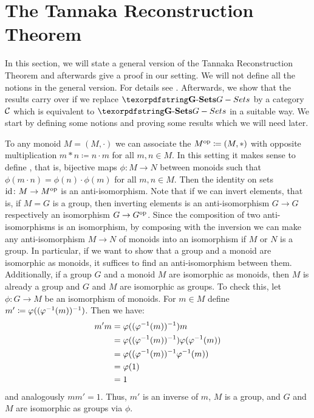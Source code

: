 
\section{The Tannaka Reconstruction Theorem}
In this section, we will state a general version of the Tannaka Reconstruction Theorem and afterwards give a proof in our setting. We will not define all the notions in the general version. For details see \cite{Tannaka_duality_in_nLab}. Afterwards, we show that the results carry over if we replace $\Gset$ by a category $\mathcal{C}$ which is equivalent to $\Gset$ in a suitable way. We start by defining some notions and proving some results which we will need later.

\begin{rem}\label{rem:opposite_monoid}
To any monoid $M = (M,\cdot)$ we can associate the  $M^{\operatorname{op}} \coloneqq (M,*)$ with opposite multiplication $m * n \coloneqq n \cdot m$ for all $m,n \in M$. In this setting it makes sense to define , that is, bijective maps $\phi\colon M \to N$ between monoids such that $\phi(m \cdot n) = \phi(n) \cdot \phi(m)$ for all $m,n \in M$. Then the identity on sets $\operatorname{id}\colon M \to M^{\operatorname{op}}$ is an anti-isomorphism. Note that if we can invert elements, that is, if $M = G$ is a group, then inverting elements is an anti-isomorphism $G \to G$ respectively an isomorphism $G \to G^{\operatorname{op}}$. Since the composition of two anti-isomorphisms is an isomorphism, by composing with the inversion we can make any anti-isomorphism $M \to N$ of monoids into an isomorphism if $M$ or $N$ is a group. In particular, if we want to show that a group and a monoid are isomorphic as monoids, it suffices to find an anti-isomorphism between them. Additionally, if a group $G$ and a monoid $M$ are isomorphic as monoids, then $M$ is already a group and $G$ and $M$ are isomorphic as groups. To check this, let $\phi\colon G \to M$ be an isomorphism of monoids. For $m \in M$ define $m' \coloneqq \varphi((\varphi^{-1}(m))^{-1})$. Then we have:
\begin{align*}
m'm &= \varphi((\varphi^{-1}(m))^{-1}) m\\
    &= \varphi((\varphi^{-1}(m))^{-1}) \varphi(\varphi^{-1}(m))\\
    &= \varphi((\varphi^{-1}(m))^{-1} \varphi^{-1}(m))\\
    &= \varphi(1)\\
    &= 1
\end{align*}
and analogously $m m' = 1$. Thus, $m'$ is an inverse of $m$, $M$ is a group, and $G$ and $M$ are isomorphic as groups via $\phi$.
\end{rem}

